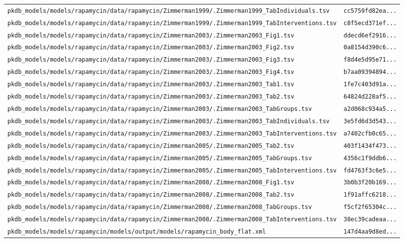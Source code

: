 \begin{longtable}{ll}
\texttt{pkdb\_models/models/rapamycin/data/rapamycin/Zimmerman1999/.Zimmerman1999\_TabIndividuals.tsv} & \texttt{cc5759fd82ea...} \\
\texttt{pkdb\_models/models/rapamycin/data/rapamycin/Zimmerman1999/.Zimmerman1999\_TabInterventions.tsv} & \texttt{c8f5ecd371ef...} \\
\texttt{pkdb\_models/models/rapamycin/data/rapamycin/Zimmerman2003/.Zimmerman2003\_Fig1.tsv} & \texttt{ddecd6ef2916...} \\
\texttt{pkdb\_models/models/rapamycin/data/rapamycin/Zimmerman2003/.Zimmerman2003\_Fig2.tsv} & \texttt{0a8154d390c6...} \\
\texttt{pkdb\_models/models/rapamycin/data/rapamycin/Zimmerman2003/.Zimmerman2003\_Fig3.tsv} & \texttt{f8d4e5d95e71...} \\
\texttt{pkdb\_models/models/rapamycin/data/rapamycin/Zimmerman2003/.Zimmerman2003\_Fig4.tsv} & \texttt{b7aa09394894...} \\
\texttt{pkdb\_models/models/rapamycin/data/rapamycin/Zimmerman2003/.Zimmerman2003\_Tab1.tsv} & \texttt{1fe7c403d91a...} \\
\texttt{pkdb\_models/models/rapamycin/data/rapamycin/Zimmerman2003/.Zimmerman2003\_Tab2.tsv} & \texttt{64824d228af5...} \\
\texttt{pkdb\_models/models/rapamycin/data/rapamycin/Zimmerman2003/.Zimmerman2003\_TabGroups.tsv} & \texttt{a2d068c934a5...} \\
\texttt{pkdb\_models/models/rapamycin/data/rapamycin/Zimmerman2003/.Zimmerman2003\_TabIndividuals.tsv} & \texttt{3e5fd6d3d543...} \\
\texttt{pkdb\_models/models/rapamycin/data/rapamycin/Zimmerman2003/.Zimmerman2003\_TabInterventions.tsv} & \texttt{a7402cfb0c65...} \\
\texttt{pkdb\_models/models/rapamycin/data/rapamycin/Zimmerman2005/.Zimmerman2005\_Tab2.tsv} & \texttt{403f1434f473...} \\
\texttt{pkdb\_models/models/rapamycin/data/rapamycin/Zimmerman2005/.Zimmerman2005\_TabGroups.tsv} & \texttt{4356c1f9ddb6...} \\
\texttt{pkdb\_models/models/rapamycin/data/rapamycin/Zimmerman2005/.Zimmerman2005\_TabInterventions.tsv} & \texttt{fd4763f3c6e5...} \\
\texttt{pkdb\_models/models/rapamycin/data/rapamycin/Zimmerman2008/.Zimmerman2008\_Fig1.tsv} & \texttt{3b0b3f20b169...} \\
\texttt{pkdb\_models/models/rapamycin/data/rapamycin/Zimmerman2008/.Zimmerman2008\_Tab2.tsv} & \texttt{1f91affc6218...} \\
\texttt{pkdb\_models/models/rapamycin/data/rapamycin/Zimmerman2008/.Zimmerman2008\_TabGroups.tsv} & \texttt{f5cf2f65304c...} \\
\texttt{pkdb\_models/models/rapamycin/data/rapamycin/Zimmerman2008/.Zimmerman2008\_TabInterventions.tsv} & \texttt{38ec39cadeaa...} \\
\texttt{pkdb\_models/models/rapamycin/models/output/models/rapamycin\_body\_flat.xml} & \texttt{147d4aa9d8ed...} \\
\end{longtable}

